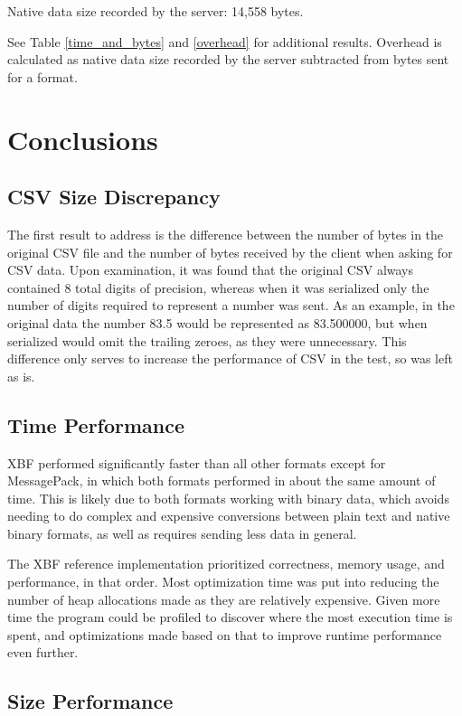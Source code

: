 \documentclass[conference]{IEEEtran}
\begin{document}
Native data size recorded by the server: 14,558 bytes.

See Table \ref{time_and_bytes} and \ref{overhead} for additional results. Overhead is calculated as native data size recorded by the server subtracted from bytes sent for a format.

\section{Conclusions}

\subsection{CSV Size Discrepancy}

The first result to address is the difference between the number of bytes in the original CSV file and the number of bytes received by the client when asking for CSV data. Upon examination, it was found that the original CSV always contained 8 total digits of precision, whereas when it was serialized only the number of digits required to represent a number was sent. As an example, in the original data the number 83.5 would be represented as 83.500000, but when serialized would omit the trailing zeroes, as they were unnecessary. This difference only serves to increase the performance of CSV in the test, so was left as is.

\subsection{Time Performance}

XBF performed significantly faster than all other formats except for MessagePack, in which both formats performed in about the same amount of time. This is likely due to both formats working with binary data, which avoids needing to do complex and expensive conversions between plain text and native binary formats, as well as requires sending less data in general.

The XBF reference implementation prioritized correctness, memory usage, and performance, in that order. Most optimization time was put into reducing the number of heap allocations made as they are relatively expensive. Given more time the program could be profiled to discover where the most execution time is spent, and optimizations made based on that to improve runtime performance even further.

\subsection{Size Performance}
\end{document}
